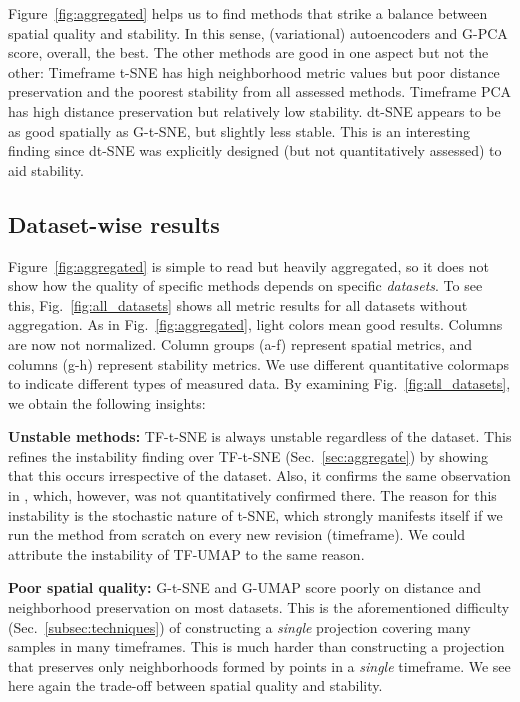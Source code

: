 Figure~\ref{fig:aggregated} helps us to find methods that strike a balance between spatial quality and stability. In this sense, (variational) autoencoders and G-PCA score, overall, the best. The other methods are good in one aspect but not the other: Timeframe t-SNE has high neighborhood metric values but poor distance preservation and the poorest stability from all assessed methods. Timeframe PCA has high distance preservation but relatively low stability. dt-SNE appears to be as good spatially as G-t-SNE, but slightly less stable. This is an interesting finding since dt-SNE was explicitly designed (but not quantitatively assessed) to aid stability.

\subsection{Dataset-wise results}
%
Figure~\ref{fig:aggregated} is simple to read but heavily aggregated, so it does not show how the quality of specific methods depends on specific \emph{datasets}. To see this, Fig.~\ref{fig:all_datasets} shows all metric results for all datasets without aggregation. As in Fig.~\ref{fig:aggregated}, light colors mean good results. Columns are now not normalized. Column groups (a-f) represent spatial metrics, and columns (g-h) represent stability metrics. We use different quantitative colormaps to indicate different types of measured data. By examining Fig.~\ref{fig:all_datasets}, we obtain the following insights:

\noindent\textbf{Unstable methods:}  TF-t-SNE is always unstable regardless of the dataset. This refines the instability finding over TF-t-SNE (Sec.~\ref{sec:aggregate}) by showing that this occurs irrespective of the dataset. Also, it confirms the same observation in \cite{Rauber2016}, which, however, was not quantitatively confirmed there. The reason for this instability is the stochastic nature of t-SNE, which strongly manifests itself if we run the method from scratch on every new revision (timeframe). We could attribute the instability of TF-UMAP to the same reason.

\noindent\textbf{Poor spatial quality:} G-t-SNE and G-UMAP score poorly on distance and neighborhood preservation on most datasets. This is the aforementioned difficulty (Sec.~\ref{subsec:techniques}) of constructing a \emph{single} projection covering many samples in many timeframes. This is much harder than constructing a projection that preserves only neighborhoods formed by points in a \emph{single} timeframe. We see here again the trade-off between spatial quality and stability.


